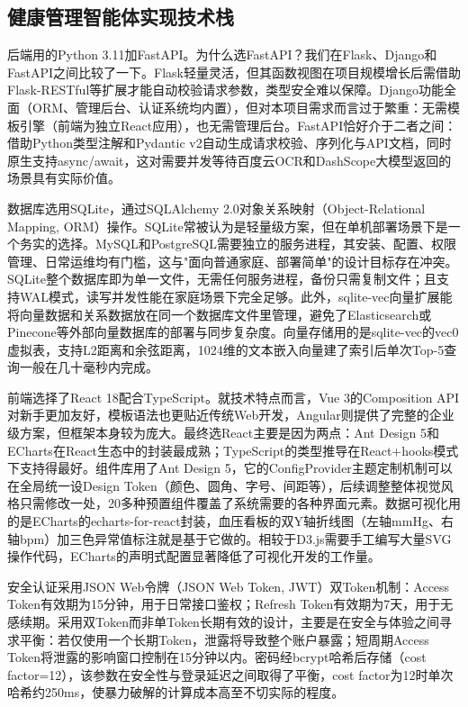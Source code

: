 \documentclass[zihao=-4,a4paper]{ctexart}
\numberwithin{figure}{section}
\numberwithin{table}{section}
\begin{document}
\subsection{健康管理智能体实现技术栈}

后端用的Python 3.11加FastAPI。为什么选FastAPI？我们在Flask、Django和FastAPI之间比较了一下。Flask轻量灵活，但其函数视图在项目规模增长后需借助Flask-RESTful等扩展才能自动校验请求参数，类型安全难以保障。Django功能全面（ORM、管理后台、认证系统均内置），但对本项目需求而言过于繁重：无需模板引擎（前端为独立React应用），也无需管理后台。FastAPI恰好介于二者之间：借助Python类型注解和Pydantic v2自动生成请求校验、序列化与API文档，同时原生支持async/await，这对需要并发等待百度云OCR和DashScope大模型返回的场景具有实际价值。

数据库选用SQLite，通过SQLAlchemy 2.0对象关系映射（Object-Relational Mapping, ORM）操作。SQLite常被认为是轻量级方案，但在单机部署场景下是一个务实的选择。MySQL和PostgreSQL需要独立的服务进程，其安装、配置、权限管理、日常运维均有门槛，这与"面向普通家庭、部署简单"的设计目标存在冲突。SQLite整个数据库即为单一文件，无需任何服务进程，备份只需复制文件；且支持WAL模式，读写并发性能在家庭场景下完全足够。此外，sqlite-vec向量扩展能将向量数据和关系数据放在同一个数据库文件里管理，避免了Elasticsearch或Pinecone等外部向量数据库的部署与同步复杂度。向量存储用的是sqlite-vec的vec0虚拟表，支持L2距离和余弦距离，1024维的文本嵌入向量建了索引后单次Top-5查询一般在几十毫秒内完成。

前端选择了React 18配合TypeScript。就技术特点而言，Vue 3的Composition API对新手更加友好，模板语法也更贴近传统Web开发，Angular则提供了完整的企业级方案，但框架本身较为庞大。最终选React主要是因为两点：Ant Design 5和ECharts在React生态中的封装最成熟；TypeScript的类型推导在React+hooks模式下支持得最好。组件库用了Ant Design 5，它的ConfigProvider主题定制机制可以在全局统一设Design Token（颜色、圆角、字号、间距等），后续调整整体视觉风格只需修改一处，20多种预置组件覆盖了系统需要的各种界面元素。数据可视化用的是ECharts的echarts-for-react封装，血压看板的双Y轴折线图（左轴mmHg、右轴bpm）加三色异常值标注就是基于它做的。相较于D3.js需要手工编写大量SVG操作代码，ECharts的声明式配置显著降低了可视化开发的工作量。

安全认证采用JSON Web令牌（JSON Web Token, JWT）双Token机制：Access Token有效期为15分钟，用于日常接口鉴权；Refresh Token有效期为7天，用于无感续期。采用双Token而非单Token长期有效的设计，主要是在安全与体验之间寻求平衡：若仅使用一个长期Token，泄露将导致整个账户暴露；短周期Access Token将泄露的影响窗口控制在15分钟以内。密码经bcrypt哈希后存储（cost factor=12），该参数在安全性与登录延迟之间取得了平衡，cost factor为12时单次哈希约250ms，使暴力破解的计算成本高至不切实际的程度。
\end{document}
